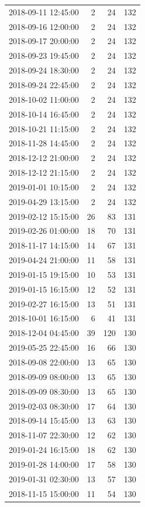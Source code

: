 \begin{tabular}{lrrr}
2018-09-11 12:45:00 & 2 & 24 & 132 \\
2018-09-16 12:00:00 & 2 & 24 & 132 \\
2018-09-17 20:00:00 & 2 & 24 & 132 \\
2018-09-23 19:45:00 & 2 & 24 & 132 \\
2018-09-24 18:30:00 & 2 & 24 & 132 \\
2018-09-24 22:45:00 & 2 & 24 & 132 \\
2018-10-02 11:00:00 & 2 & 24 & 132 \\
2018-10-14 16:45:00 & 2 & 24 & 132 \\
2018-10-21 11:15:00 & 2 & 24 & 132 \\
2018-11-28 14:45:00 & 2 & 24 & 132 \\
2018-12-12 21:00:00 & 2 & 24 & 132 \\
2018-12-12 21:15:00 & 2 & 24 & 132 \\
2019-01-01 10:15:00 & 2 & 24 & 132 \\
2019-04-29 13:15:00 & 2 & 24 & 132 \\
2019-02-12 15:15:00 & 26 & 83 & 131 \\
2019-02-26 01:00:00 & 18 & 70 & 131 \\
2018-11-17 14:15:00 & 14 & 67 & 131 \\
2019-04-24 21:00:00 & 11 & 58 & 131 \\
2019-01-15 19:15:00 & 10 & 53 & 131 \\
2019-01-15 16:15:00 & 12 & 52 & 131 \\
2019-02-27 16:15:00 & 13 & 51 & 131 \\
2018-10-01 16:15:00 & 6 & 41 & 131 \\
2018-12-04 04:45:00 & 39 & 120 & 130 \\
2019-05-25 22:45:00 & 16 & 66 & 130 \\
2018-09-08 22:00:00 & 13 & 65 & 130 \\
2018-09-09 08:00:00 & 13 & 65 & 130 \\
2018-09-09 08:30:00 & 13 & 65 & 130 \\
2019-02-03 08:30:00 & 17 & 64 & 130 \\
2018-09-14 15:45:00 & 13 & 63 & 130 \\
2018-11-07 22:30:00 & 12 & 62 & 130 \\
2019-01-24 16:15:00 & 18 & 62 & 130 \\
2019-01-28 14:00:00 & 17 & 58 & 130 \\
2019-01-31 02:30:00 & 13 & 57 & 130 \\
2018-11-15 15:00:00 & 11 & 54 & 130 \\

\end{tabular}

